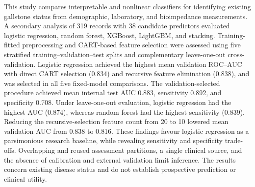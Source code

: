 This study compares interpretable and nonlinear classifiers for identifying existing gallstone status from demographic, laboratory, and bioimpedance measurements. A secondary analysis of 319 records with 38 candidate predictors evaluated logistic regression, random forest, XGBoost, LightGBM, and stacking. Training-fitted preprocessing and CART-based feature selection were assessed using five stratified training--validation--test splits and complementary leave-one-out cross-validation. Logistic regression achieved the highest mean validation ROC--AUC with direct CART selection (0.834) and recursive feature elimination (0.838), and was selected in all five fixed-model comparisons. The validation-selected procedure achieved mean internal test AUC 0.883, sensitivity 0.892, and specificity 0.708. Under leave-one-out evaluation, logistic regression had the highest AUC (0.874), whereas random forest had the highest sensitivity (0.839). Reducing the recursive-selection feature count from 20 to 10 lowered mean validation AUC from 0.838 to 0.816. These findings favour logistic regression as a parsimonious research baseline, while revealing sensitivity and specificity trade-offs. Overlapping and reused assessment partitions, a single clinical source, and the absence of calibration and external validation limit inference. The results concern existing disease status and do not establish prospective prediction or clinical utility.
